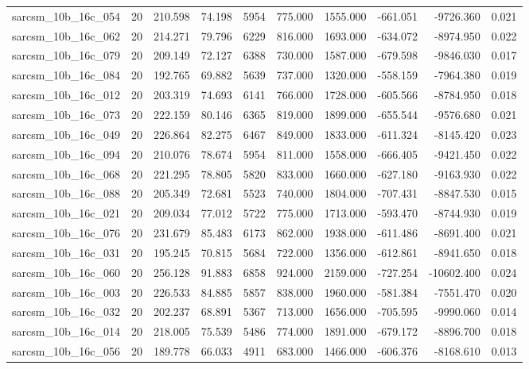 \begin{tabular}{lrrrrrrrrr}
sarcsm\_10b\_16c\_054 & 20 & 210.598 & 74.198 & 5954 & 775.000 & 1555.000 & -661.051 & -9726.360 & 0.021 \\
sarcsm\_10b\_16c\_062 & 20 & 214.271 & 79.796 & 6229 & 816.000 & 1693.000 & -634.072 & -8974.950 & 0.022 \\
sarcsm\_10b\_16c\_079 & 20 & 209.149 & 72.127 & 6388 & 730.000 & 1587.000 & -679.598 & -9846.030 & 0.017 \\
sarcsm\_10b\_16c\_084 & 20 & 192.765 & 69.882 & 5639 & 737.000 & 1320.000 & -558.159 & -7964.380 & 0.019 \\
sarcsm\_10b\_16c\_012 & 20 & 203.319 & 74.693 & 6141 & 766.000 & 1728.000 & -605.566 & -8784.950 & 0.018 \\
sarcsm\_10b\_16c\_073 & 20 & 222.159 & 80.146 & 6365 & 819.000 & 1899.000 & -655.544 & -9576.680 & 0.021 \\
sarcsm\_10b\_16c\_049 & 20 & 226.864 & 82.275 & 6467 & 849.000 & 1833.000 & -611.324 & -8145.420 & 0.023 \\
sarcsm\_10b\_16c\_094 & 20 & 210.076 & 78.674 & 5954 & 811.000 & 1558.000 & -666.405 & -9421.450 & 0.022 \\
sarcsm\_10b\_16c\_068 & 20 & 221.295 & 78.805 & 5820 & 833.000 & 1660.000 & -627.180 & -9163.930 & 0.022 \\
sarcsm\_10b\_16c\_088 & 20 & 205.349 & 72.681 & 5523 & 740.000 & 1804.000 & -707.431 & -8847.530 & 0.015 \\
sarcsm\_10b\_16c\_021 & 20 & 209.034 & 77.012 & 5722 & 775.000 & 1713.000 & -593.470 & -8744.930 & 0.019 \\
sarcsm\_10b\_16c\_076 & 20 & 231.679 & 85.483 & 6173 & 862.000 & 1938.000 & -611.486 & -8691.400 & 0.021 \\
sarcsm\_10b\_16c\_031 & 20 & 195.245 & 70.815 & 5684 & 722.000 & 1356.000 & -612.861 & -8941.650 & 0.018 \\
sarcsm\_10b\_16c\_060 & 20 & 256.128 & 91.883 & 6858 & 924.000 & 2159.000 & -727.254 & -10602.400 & 0.024 \\
sarcsm\_10b\_16c\_003 & 20 & 226.533 & 84.885 & 5857 & 838.000 & 1960.000 & -581.384 & -7551.470 & 0.020 \\
sarcsm\_10b\_16c\_032 & 20 & 202.237 & 68.891 & 5367 & 713.000 & 1656.000 & -705.595 & -9990.060 & 0.014 \\
sarcsm\_10b\_16c\_014 & 20 & 218.005 & 75.539 & 5486 & 774.000 & 1891.000 & -679.172 & -8896.700 & 0.018 \\
sarcsm\_10b\_16c\_056 & 20 & 189.778 & 66.033 & 4911 & 683.000 & 1466.000 & -606.376 & -8168.610 & 0.013 \\

\end{tabular}
